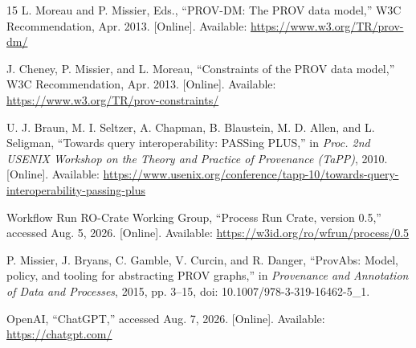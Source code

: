 \documentclass[conference]{IEEEtran}
\theoremstyle{tideproposition}
\begin{document}
\begin{thebibliography}{15}
L. Moreau and P. Missier, Eds., ``PROV-DM: The PROV data model,''
W3C Recommendation, Apr. 2013. [Online]. Available: \url{https://www.w3.org/TR/prov-dm/}

J. Cheney, P. Missier, and L. Moreau, ``Constraints of the PROV data model,''
W3C Recommendation, Apr. 2013. [Online]. Available: \url{https://www.w3.org/TR/prov-constraints/}

U. J. Braun, M. I. Seltzer, A. Chapman, B. Blaustein, M. D. Allen, and L. Seligman,
``Towards query interoperability: PASSing PLUS,''
in \emph{Proc. 2nd USENIX Workshop on the Theory and Practice of Provenance (TaPP)}, 2010. [Online]. Available: \url{https://www.usenix.org/conference/tapp-10/towards-query-interoperability-passing-plus}

Workflow Run RO-Crate Working Group, ``Process Run Crate, version 0.5,'' accessed Aug. 5, 2026. [Online]. Available: \url{https://w3id.org/ro/wfrun/process/0.5}

P. Missier, J. Bryans, C. Gamble, V. Curcin, and R. Danger,
``ProvAbs: Model, policy, and tooling for abstracting PROV graphs,''
in \emph{Provenance and Annotation of Data and Processes}, 2015, pp. 3--15, doi: 10.1007/978-3-319-16462-5\_1.

OpenAI, ``ChatGPT,'' accessed Aug. 7, 2026. [Online].
Available: \url{https://chatgpt.com/}

\end{thebibliography}
\end{document}
